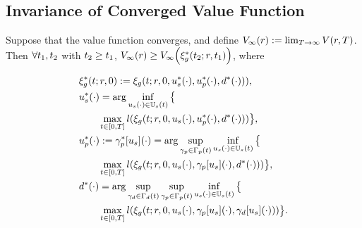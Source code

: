 \subsection{Invariance of Converged Value Function}
 \begin{prop}
   \label{prop:main}
   Suppose that the value function converges, and define $V_\infty(r) := \lim_{T\rightarrow\infty}V(r, T)$. Then $\forall t_1, t_2$ with $t_2 \ge t_1$, $V_\infty(r) \ge V_\infty\Big(\xi_g^*(t_2; r, t_1)\Big)$, where

   \begin{align}
   &\xi_g^*(t; r, 0) := \xi_g(t; r, 0, u_s^*(\cdot), u_p^*(\cdot), d^*(\cdot))), \\
   &u_s^*(\cdot) = \arg \inf_{u_s(\cdot)\in\mathbb{U}_s(t)}\big\{\notag\\
   & \qquad \max_{t \in [0, T]} l(\xi_g(t; r, 0, u_s(\cdot), u_p^*(\cdot), d^*(\cdot))) \big\},\\
   & u_p^*(\cdot) := \gamma_p^*[u_s](\cdot) = \arg \sup_{\gamma_{p} \in \Gamma_p(t)} \inf_{u_s(\cdot) \in \mathbb{U}_s(t)} \big\{\notag \\
   & \qquad \max_{t \in [0, T]} l(\xi_g(t; r, 0, u_s(\cdot), \gamma_p[u_s](\cdot), d^*(\cdot))) \big\}, \\
   & d^*(\cdot) = \arg \sup_{\gamma_{d} \in \Gamma_d(t)} \sup_{\gamma_{p} \in \Gamma_p(t)} \inf_{u_s(\cdot) \in \mathbb{U}_s(t)} \big\{\notag\\
   & \qquad \max_{t \in [0, T]} l(\xi_g(t; r, 0, u_s(\cdot), \gamma_p[u_s](\cdot), \gamma_d[u_s](\cdot))) \big\}.
   \end{align}
 \end{prop}

